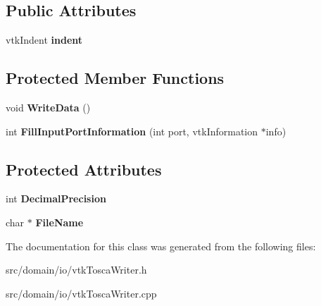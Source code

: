 \subsection*{Public Attributes}
\begin{DoxyCompactItemize}
\item 
\hypertarget{classvtk_tosca_writer_abd676c013af5cdef18cbafe7ae85acd3}{}vtk\+Indent {\bfseries indent}\label{classvtk_tosca_writer_abd676c013af5cdef18cbafe7ae85acd3}

\end{DoxyCompactItemize}
\subsection*{Protected Member Functions}
\begin{DoxyCompactItemize}
\item 
\hypertarget{classvtk_tosca_writer_a444008a99fd5fd5ce380309d8f9af1e5}{}void {\bfseries Write\+Data} ()\label{classvtk_tosca_writer_a444008a99fd5fd5ce380309d8f9af1e5}

\item 
\hypertarget{classvtk_tosca_writer_af14502939fd038287e78c228a10bfd8f}{}int {\bfseries Fill\+Input\+Port\+Information} (int port, vtk\+Information $\ast$info)\label{classvtk_tosca_writer_af14502939fd038287e78c228a10bfd8f}

\end{DoxyCompactItemize}
\subsection*{Protected Attributes}
\begin{DoxyCompactItemize}
\item 
\hypertarget{classvtk_tosca_writer_a7d62f9d3bf0707a3aaac114a80b77f0e}{}int {\bfseries Decimal\+Precision}\label{classvtk_tosca_writer_a7d62f9d3bf0707a3aaac114a80b77f0e}

\item 
\hypertarget{classvtk_tosca_writer_a25a290b1738073fc8804a0b256410eb4}{}char $\ast$ {\bfseries File\+Name}\label{classvtk_tosca_writer_a25a290b1738073fc8804a0b256410eb4}

\end{DoxyCompactItemize}


The documentation for this class was generated from the following files\+:\begin{DoxyCompactItemize}
\item 
src/domain/io/vtk\+Tosca\+Writer.\+h\item 
src/domain/io/vtk\+Tosca\+Writer.\+cpp\end{DoxyCompactItemize}

